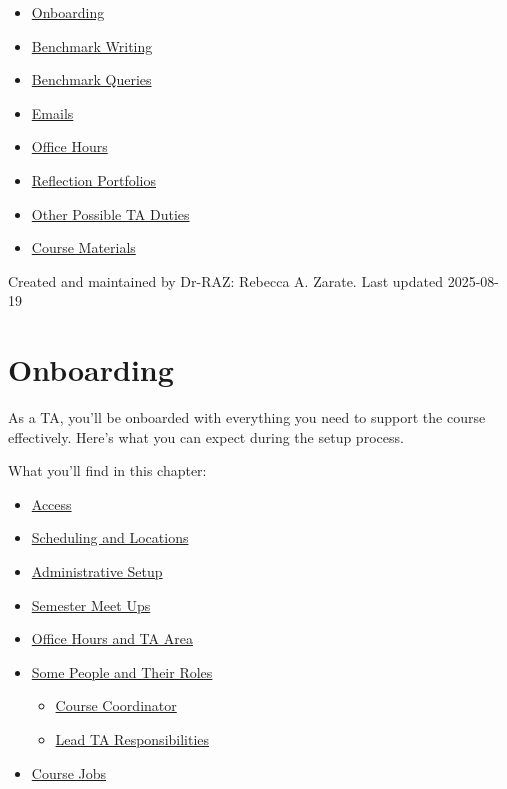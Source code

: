 \documentclass[
]{article}
\providecommand{\tightlist}{%
  \setlength{\itemsep}{0pt}\setlength{\parskip}{0pt}}
\begin{document}
\begin{itemize}
\tightlist
\item
  \protect\hyperlink{onboarding}{Onboarding}
\item
  \protect\hyperlink{benchmark-writing}{Benchmark Writing}
\item
  \protect\hyperlink{benchmark-queries}{Benchmark Queries}
\item
  \protect\hyperlink{emails}{Emails}
\item
  \protect\hyperlink{office-hours}{Office Hours}
\item
  \protect\hyperlink{reflection-portfolios}{Reflection Portfolios}
\item
  \protect\hyperlink{other-possible-ta-duties}{Other Possible TA Duties}
\item
  \protect\hyperlink{course-materials}{Course Materials}
\end{itemize}

Created and maintained by Dr-RAZ: Rebecca A. Zarate. Last updated 2025-08-19

\hypertarget{onboarding}{%
\section{Onboarding}\label{onboarding}}

As a TA, you'll be onboarded with everything you need to support the course effectively. Here's what you can expect during the setup process.

What you'll find in this chapter:

\begin{itemize}
\tightlist
\item
  \protect\hyperlink{access}{Access}
\item
  \protect\hyperlink{scheduling-and-locations}{Scheduling and Locations}
\item
  \protect\hyperlink{administrative-setup}{Administrative Setup}
\item
  \protect\hyperlink{semester-meet-ups}{Semester Meet Ups}
\item
  \protect\hyperlink{office-hours-and-ta-area}{Office Hours and TA Area}
\item
  \protect\hyperlink{some-people-and-their-roles}{Some People and Their Roles}

  \begin{itemize}
  \tightlist
  \item
    \protect\hyperlink{course-coordinator}{Course Coordinator}
  \item
    \protect\hyperlink{lead-ta-responsibilities}{Lead TA Responsibilities}
  \end{itemize}
\item
  \protect\hyperlink{course-jobs}{Course Jobs}
\end{itemize}
\end{document}
